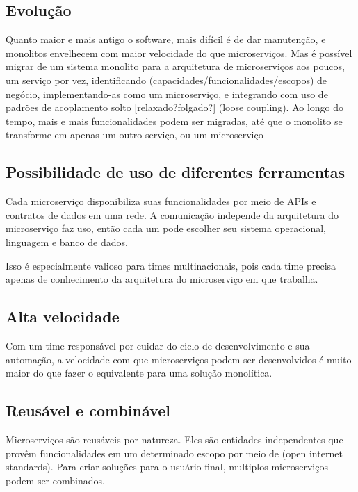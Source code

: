 \subsection{Evolução}

Quanto maior e mais antigo o software, mais difícil é de dar manutenção, e monolitos envelhecem com maior velocidade do que microserviços. Mas é possível migrar de um sistema monolito para a arquitetura de microserviços aos poucos, um serviço por vez, identificando (capacidades/funcionalidades/escopos) de negócio, implementando-as como um microserviço, e integrando com uso de padrões de acoplamento solto [relaxado?folgado?] (loose coupling). Ao longo do tempo, mais e mais funcionalidades podem ser migradas, até que o monolito se transforme em apenas um outro serviço, ou um microserviço

\subsection{Possibilidade de uso de diferentes ferramentas}

Cada microserviço disponibiliza suas funcionalidades por meio de APIs e contratos de dados em uma rede. A comunicação independe da arquitetura do microserviço faz uso, então cada um pode escolher seu sistema operacional, linguagem e banco de dados.

Isso é especialmente valioso para times multinacionais, pois cada time precisa apenas de conhecimento da arquitetura do microserviço em que trabalha.

\subsection{Alta velocidade}

Com um time responsável por cuidar do ciclo de desenvolvimento e sua automação, a velocidade com que microserviços podem ser desenvolvidos é muito maior do que fazer o equivalente para uma solução monolítica.

\subsection{Reusável e combinável}

Microserviços são reusáveis por natureza. Eles são entidades independentes que provêm funcionalidades em um determinado escopo por meio de (open internet standards). Para criar soluções para o usuário final, multiplos microserviços podem ser combinados.

